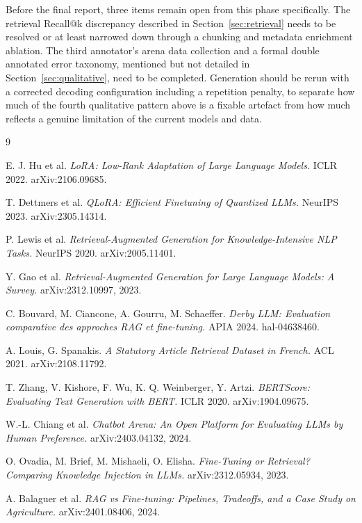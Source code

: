 \documentclass[11pt, a4paper]{article}
\begin{document}
Before the final report, three items remain open from this phase specifically. The retrieval Recall@k discrepancy described in Section~\ref{sec:retrieval} needs to be resolved or at least narrowed down through a chunking and metadata enrichment ablation. The third annotator's arena data collection and a formal double annotated error taxonomy, mentioned but not detailed in Section~\ref{sec:qualitative}, need to be completed. Generation should be rerun with a corrected decoding configuration including a repetition penalty, to separate how much of the fourth qualitative pattern above is a fixable artefact from how much reflects a genuine limitation of the current models and data.

\begin{thebibliography}{9}

E. J. Hu et al.
\textit{LoRA: Low-Rank Adaptation of Large Language Models.}
ICLR 2022. arXiv:2106.09685.

T. Dettmers et al.
\textit{QLoRA: Efficient Finetuning of Quantized LLMs.}
NeurIPS 2023. arXiv:2305.14314.

P. Lewis et al.
\textit{Retrieval-Augmented Generation for Knowledge-Intensive NLP Tasks.}
NeurIPS 2020. arXiv:2005.11401.

Y. Gao et al.
\textit{Retrieval-Augmented Generation for Large Language Models: A Survey.}
arXiv:2312.10997, 2023.

C. Bouvard, M. Ciancone, A. Gourru, M. Schaeffer.
\textit{Derby LLM: Evaluation comparative des approches RAG et fine-tuning.}
APIA 2024. hal-04638460.

A. Louis, G. Spanakis.
\textit{A Statutory Article Retrieval Dataset in French.}
ACL 2021. arXiv:2108.11792.

T. Zhang, V. Kishore, F. Wu, K. Q. Weinberger, Y. Artzi.
\textit{BERTScore: Evaluating Text Generation with BERT.}
ICLR 2020. arXiv:1904.09675.

W.-L. Chiang et al.
\textit{Chatbot Arena: An Open Platform for Evaluating LLMs by Human Preference.}
arXiv:2403.04132, 2024.

O. Ovadia, M. Brief, M. Mishaeli, O. Elisha.
\textit{Fine-Tuning or Retrieval? Comparing Knowledge Injection in LLMs.}
arXiv:2312.05934, 2023.

A. Balaguer et al.
\textit{RAG vs Fine-tuning: Pipelines, Tradeoffs, and a Case Study on Agriculture.}
arXiv:2401.08406, 2024.

\end{thebibliography}
\end{document}
